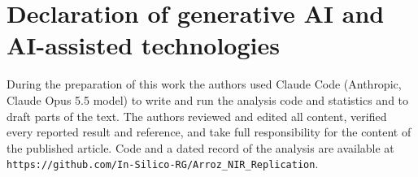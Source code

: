 \documentclass[final,5p,times,twocolumn]{elsarticle}
\newcommand{\added}[1]{{\color{blue}#1}}
\begin{document}
\added{\section*{Declaration of generative AI and AI-assisted technologies}
During the preparation of this work the authors used Claude Code (Anthropic, Claude Opus 5.5 model) to write and run the analysis code and statistics and to draft parts of the text. The authors reviewed and edited all content, verified every reported result and reference, and take full responsibility for the content of the published article. Code and a dated record of the analysis are available at \texttt{https://github.com/\allowbreak In-Silico-RG/\allowbreak Arroz\_NIR\_Replication}.}



\end{document}
